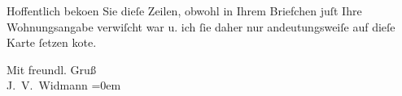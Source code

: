 \pstart
           Hoffentlich beko{\geminationm}en Sie dieſe Zeilen, obwohl in Ihrem
               Briefchen juſt Ihre Wohnungsangabe verwiſcht war u. ich ſie daher nur andeutungsweiſe
               auf dieſe Karte ſetzen ko{\geminationn}te.\pend
           
\pstart
           Mit freundl. Gruß{\\[\baselineskip]}\spacefill\mbox{J. V. Widmann}\pend
           \leftskip=0em{}\endnumbering{}  
      